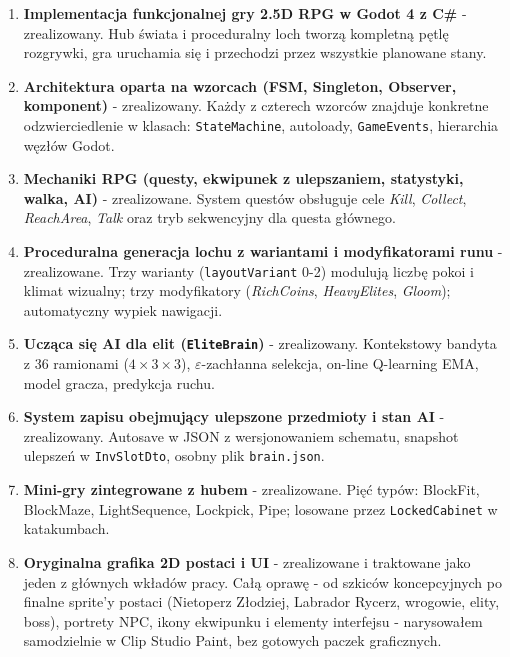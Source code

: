 \begin{enumerate}
    \item \textbf{Implementacja funkcjonalnej gry 2.5D RPG w Godot 4 z C\#} - zrealizowany. Hub świata i proceduralny loch tworzą kompletną pętlę rozgrywki, gra uruchamia się i przechodzi przez wszystkie planowane stany.
    \item \textbf{Architektura oparta na wzorcach (FSM, Singleton, Observer, komponent)} - zrealizowany. Każdy z czterech wzorców znajduje konkretne odzwierciedlenie w klasach: \texttt{StateMachine}, autoloady, \texttt{GameEvents}, hierarchia węzłów Godot.
    \item \textbf{Mechaniki RPG (questy, ekwipunek z ulepszaniem, statystyki, walka, AI)} - zrealizowane. System questów obsługuje cele \textit{Kill}, \textit{Collect}, \textit{ReachArea}, \textit{Talk} oraz tryb sekwencyjny dla questa głównego.
    \item \textbf{Proceduralna generacja lochu z wariantami i modyfikatorami runu} - zrealizowane. Trzy warianty (\texttt{layoutVariant} 0-2) modulują liczbę pokoi i klimat wizualny; trzy modyfikatory (\textit{RichCoins}, \textit{HeavyElites}, \textit{Gloom}); automatyczny wypiek nawigacji.
    \item \textbf{Ucząca się AI dla elit (\texttt{EliteBrain})} - zrealizowany. Kontekstowy bandyta z 36 ramionami ($4 \times 3 \times 3$), $\varepsilon$-zachłanna selekcja, on-line Q-learning EMA, model gracza, predykcja ruchu.
    \item \textbf{System zapisu obejmujący ulepszone przedmioty i stan AI} - zrealizowany. Autosave w JSON z wersjonowaniem schematu, snapshot ulepszeń w \texttt{InvSlotDto}, osobny plik \texttt{brain.json}.
    \item \textbf{Mini-gry zintegrowane z hubem} - zrealizowane. Pięć typów: BlockFit, BlockMaze, LightSequence, Lockpick, Pipe; losowane przez \texttt{LockedCabinet} w katakumbach.
    \item \textbf{Oryginalna grafika 2D postaci i UI} - zrealizowane i traktowane jako jeden z głównych wkładów pracy. Całą oprawę - od szkiców koncepcyjnych po finalne sprite'y postaci (Nietoperz Złodziej, Labrador Rycerz, wrogowie, elity, boss), portrety NPC, ikony ekwipunku i elementy interfejsu - narysowałem samodzielnie w Clip Studio Paint, bez gotowych paczek graficznych.
\end{enumerate}

